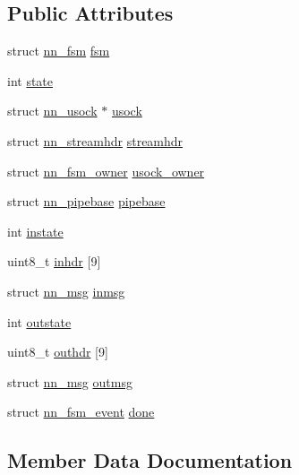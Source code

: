 \subsection*{Public Attributes}
\begin{DoxyCompactItemize}
\item 
struct \hyperlink{structnn__fsm}{nn\+\_\+fsm} \hyperlink{structnn__slibfabric_a286b24bade62ada23cb0e86918633d4b}{fsm}
\item 
int \hyperlink{structnn__slibfabric_a02affdda8c79dd7796e1afb4b5ccb8fb}{state}
\item 
struct \hyperlink{structnn__usock}{nn\+\_\+usock} $\ast$ \hyperlink{structnn__slibfabric_a5208cceb46c2f7a8d1854850aa536739}{usock}
\item 
struct \hyperlink{structnn__streamhdr}{nn\+\_\+streamhdr} \hyperlink{structnn__slibfabric_a46abae8e6f3b15f833bccd0e3f127496}{streamhdr}
\item 
struct \hyperlink{structnn__fsm__owner}{nn\+\_\+fsm\+\_\+owner} \hyperlink{structnn__slibfabric_ad264fc1b912488e4df1030020ee30b53}{usock\+\_\+owner}
\item 
struct \hyperlink{structnn__pipebase}{nn\+\_\+pipebase} \hyperlink{structnn__slibfabric_a504d49b781940a83efa4c9169eeadf5d}{pipebase}
\item 
int \hyperlink{structnn__slibfabric_a3801ed95ecf359d7e21d9d88ef4fcccb}{instate}
\item 
uint8\+\_\+t \hyperlink{structnn__slibfabric_a930c2ac8a0d0642d33b1683473041d44}{inhdr} \mbox{[}9\mbox{]}
\item 
struct \hyperlink{structnn__msg}{nn\+\_\+msg} \hyperlink{structnn__slibfabric_aeeaea59b889f4741713be9e2471c897c}{inmsg}
\item 
int \hyperlink{structnn__slibfabric_afc303982dd45c73cdbcc948fbc04fa66}{outstate}
\item 
uint8\+\_\+t \hyperlink{structnn__slibfabric_a4428cf5b95e78538e0aa312bd2b921bf}{outhdr} \mbox{[}9\mbox{]}
\item 
struct \hyperlink{structnn__msg}{nn\+\_\+msg} \hyperlink{structnn__slibfabric_a4f2946368ef1eb08e41a41ee6d2bea7d}{outmsg}
\item 
struct \hyperlink{structnn__fsm__event}{nn\+\_\+fsm\+\_\+event} \hyperlink{structnn__slibfabric_a3c144b09215664a0c07f810cb44398bf}{done}
\end{DoxyCompactItemize}


\subsection{Member Data Documentation}
